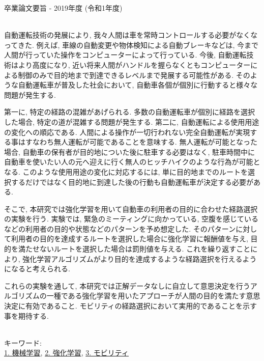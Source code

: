 卒業論文要旨 - 2019年度 (令和1年度)
\begin{center}
\begin{large}
\end{large}
\end{center}

~ \\

自動運転技術の発展により, 我々人間は車を常時コントロールする必要がなくなってきた.
例えば, 車線の自動変更や物体検知による自動ブレーキなどは, 今まで人間が行っていた操作をコンピューターによって行っている.
今後, 自動運転技術はより高度になり, 近い将来人間がハンドルを握らなくともコンピューターによる制御のみで目的地まで到達できるレベルまで発展する可能性がある.
そのような自動運転車が普及した社会において, 自動車各個が個別に行動すると様々な問題が発生する.

第一に, 特定の経路の混雑があげられる.
多数の自動運転車が個別に経路を選択した場合, 特定の道が混雑する問題が発生する.
第二に, 自動運転による使用用途の変化への順応である. 人間による操作が一切行われない完全自動運転が実現する事はすなわち無人運転が可能であることを意味する.
無人運転が可能となった場合, 自動車の保有者が目的地についた後に駐車する必要はなく, 駐車時間中に自動車を使いたい人の元へ迎えに行く無人のヒッチハイクのような行為が可能となる.
このような使用用途の変化に対応するには, 単に目的地までのルートを選択するだけではなく目的地に到達した後の行動も自動運転車が決定する必要がある.

そこで, 本研究では強化学習を用いて自動車の利用者の目的に合わせた経路選択の実験を行う.
実験では, 緊急のミーティングに向かっている, 空腹を感じているなどの利用者の目的や状態などのパターンを予め想定した. そのパターンに対して利用者の目的を達成するルートを選択した場合に強化学習に報酬値を与え, 目的を満たせないルートを選択した場合は罰則値を与える.
これを繰り返すことにより, 強化学習アルゴリズムがより目的を達成するような経路選択を行えるようになると考えられる.

これらの実験を通して, 本研究では正解データなしに自立して意思決定を行うアルゴリズムの一種である強化学習を用いたアプローチが人間の目的を満たす意思決定に有効であること. モビリティの経路選択において実用的であることを示す事を期待する.

~ \\
キーワード:\\
\underline{1. 機械学習},
\underline{2. 強化学習},
\underline{3. モビリティ}
\begin{flushright}
\dept \\
\author
\end{flushright}
